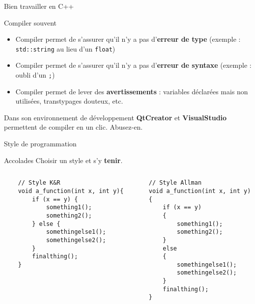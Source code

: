 
\date[30 janv. 2017]{Mercredi 30 janvier 2018}
\subtitle{Bonnes pratiques de programmation en C++}
\maketitle

\begin{frame}{Bien travailler en C++}

\begin{block}{Compiler souvent}
    \begin{itemize}
        \item Compiler permet de s'assurer qu'il n'y a pas d'\textbf{erreur de type} (exemple : \texttt{std::string} au lieu d'un \texttt{float})
        \item Compiler permet de s'assurer qu'il n'y a pas d'\textbf{erreur de syntaxe} (exemple : oubli d'un \texttt{;})
        \item Compiler permet de lever des \textbf{avertissements} : variables déclarées mais non utilisées, transtypages douteux, etc.
    \end{itemize}
\end{block}

\begin{block}{Dans son environnement de développement}
\textbf{QtCreator} et \textbf{VisualStudio} permettent de compiler en un clic. Abusez-en.
\end{block}

\end{frame}

\begin{frame}[fragile]{Style de programmation}

\begin{block}{Accolades}
Choisir un style et s'y \textbf{tenir}.
\end{block}

\begin{columns}
    \begin{column}{0.5\textwidth}
    \begin{verbatim}
    // Style K&R
    void a_function(int x, int y){
        if (x == y) {
            something1();
            something2();
        } else {
            somethingelse1();
            somethingelse2();
        }
        finalthing();
    }
    \end{verbatim}
    \end{column}
    \begin{column}{0.5\textwidth}
    \begin{verbatim}
    // Style Allman
    void a_function(int x, int y)
    {
        if (x == y)
        {
            something1();
            something2();
        }
        else
        {
            somethingelse1();
            somethingelse2();
        }
        finalthing();
    }
    \end{verbatim}
    \end{column}
\end{columns}
\end{frame}

